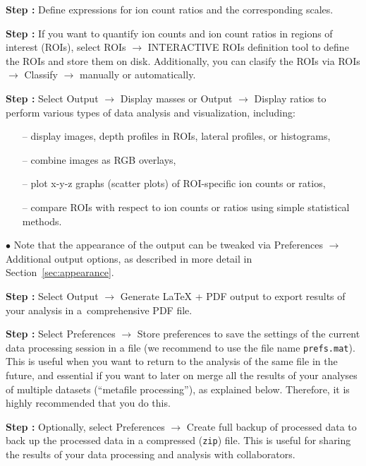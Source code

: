 \documentclass[a4paper, 11pt]{article}
\newcommand{\ttt}[1]{\texttt{#1}}
\newcommand{\lans}[1]{{\color{magenta}#1}}
\newcommand{\lanscb}[1]{{\color{darkgreen}#1}}
\newcommand{\lanstf}[1]{{\color{cyan}#1}}
\newcommand\ra{\rightarrow}
\newcounter{step}
\newcommand\s{\addtocounter{step}{1}\vskip5pt\noindent\textbf{Step \thestep:}{ }}
\newcommand\bul{\vskip5pt\noindent$\bullet${ }}
\begin{document}
\s Define \lanstf{expressions} for ion count ratios and the corresponding \lanstf{scales}. 

\s If you want to quantify ion counts and ion count ratios in regions of interest (ROIs), select \lans{ROIs} $\ra$ \lans{INTERACTIVE ROIs definition tool} to define the ROIs and store them on disk. Additionally, you can clasify the ROIs via \lans{ROIs} $\ra$ \lans{Classify} $\ra$ \lans{manually} or \lans{automatically}.

\s Select \lans{Output} $\ra$ \lans{Display masses} or \lans{Output} $\ra$ \lans{Display ratios} to perform various types of data analysis and visualization, including:

\begin{itemize}
\item[--] display \lanscb{images}, \lanscb{depth profiles in ROIs}, \lanscb{lateral profiles}, or \lanscb{histograms},
\item[--] \lanscb{combine images as RGB} overlays,
\item[--] \lanscb{plot x-y-z graphs} (scatter plots) of ROI-specific ion counts or ratios,  
\item[--] \lanscb{compare ROIs} with respect to ion counts or ratios using simple statistical methods.
\end{itemize}
%

\bul Note that the appearance of the output can be tweaked via \lans{Preferences} $\ra$ \lans{Additional output options}, as described in more detail in Section~\ref{sec:appearance}.

\s Select \lans{Output} $\ra$ \lans{Generate LaTeX + PDF output} to export results of your analysis in a~comprehensive PDF file. 

\s Select \lans{Preferences} $\ra$ \lans{Store preferences} to save the settings of the current data processing session in a file (we recommend to use the file name \ttt{prefs.mat}). This is useful when you want to return to the analysis of the same file in the future, and essential if you want to later on merge all the results of your analyses of multiple datasets (``metafile processing''), as explained below. Therefore, it is highly recommended that you do this.

\s Optionally, select \lans{Preferences} $\ra$ \lans{Create full backup of processed data} to back up the processed data in a compressed (\ttt{zip}) file. This is useful for sharing the results of your data processing and analysis with collaborators.

\end{document}
